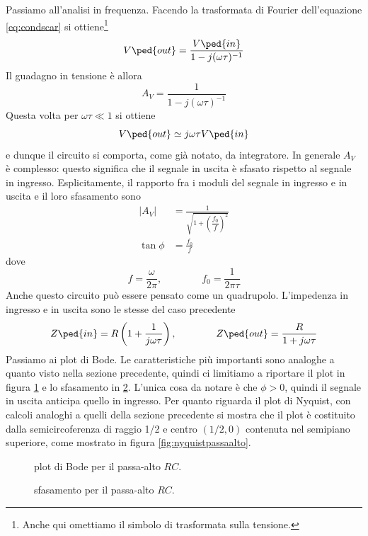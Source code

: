 \documentclass[a4paper, 11pt]{article}
\begin{document}
	Passiamo all'analisi in frequenza. Facendo la trasformata di Fourier dell'equazione \ref{eq:condscar} si ottiene\footnote{Anche qui omettiamo il simbolo di trasformata sulla tensione.}
	\[V\ped{out}=\frac{V\ped{in}}{1-j(\omega\tau)^{-1}}\]
	Il guadagno in tensione è allora
	\[A_V=\frac{1}{1-j(\omega\tau)^{-1}}\]
	Questa volta per $\omega\tau\ll1$ si ottiene
	\[V\ped{out}\simeq j\omega\tau V\ped{in}\]
	e dunque il circuito si comporta, come già notato, da integratore.
	In generale $A_V$ è complesso: questo significa che il segnale in uscita è sfasato rispetto al segnale in ingresso. Esplicitamente, il rapporto fra i moduli del segnale in ingresso e in uscita e il loro sfasamento sono
	\begin{align*}
	|A_V|&=\frac{1}{\sqrt{1+\left(\dfrac{f_0}{f}\right)^2}}\\\tan\phi&=\frac{f_0}{f}	
	\end{align*}
	dove
	\[f=\frac{\omega}{2\pi},\qquad\qquad f_0=\frac{1}{2\pi\tau}\]
	Anche questo circuito può essere pensato come un quadrupolo. L'impedenza in ingresso e in uscita sono le stesse del caso precedente
	\[Z\ped{in}=R\left(1+\frac{1}{j\omega \tau}\right),\qquad\qquad Z\ped{out}=\frac{R}{1+j\omega\tau}\]
	Passiamo ai plot di Bode. Le caratteristiche più importanti sono analoghe a quanto visto nella sezione precedente, quindi ci limitiamo a riportare il plot in figura \ref{fig:bodepassaalto} e lo sfasamento in \ref{fig:phipassaalto}. L'unica cosa da notare è che $\phi>0$, quindi il segnale in uscita anticipa quello in ingresso. Per quanto riguarda il plot di Nyquist, con calcoli analoghi a quelli della sezione precedente si mostra che il plot è costituito dalla semicircoferenza di raggio 1/2 e centro $(1/2,0)$ contenuta nel semipiano superiore, come mostrato in figura \ref{fig:nyquistpassaalto}.
	\begin{figure}[h!]
		\centering
		\caption{plot di Bode per il passa-alto $RC$.}
		\label{fig:bodepassaalto}
	\end{figure}
	\begin{figure}[h!]
		\centering
		\caption{sfasamento per il passa-alto $RC$.}
		\label{fig:phipassaalto}
	\end{figure}
\end{document}
